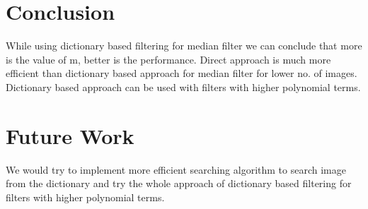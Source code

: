 \documentclass[journal]{IEEEtran}
\begin{document}
	
	\ifCLASSOPTIONcaptionsoff
	\newpage
	\fi
	
\section{\textbf{Conclusion}}
	While using dictionary based filtering for median filter we can conclude that more is the value of m, better is the performance. Direct approach is much more efficient than dictionary based approach for median filter for lower no. of images. Dictionary based approach can be used with filters with higher polynomial terms. 
	
    \section{\textbf{Future Work}}
    We would try to implement more efficient searching algorithm to search image from the dictionary and try the whole approach of dictionary based filtering for filters with higher polynomial terms.
	
\end{document}
